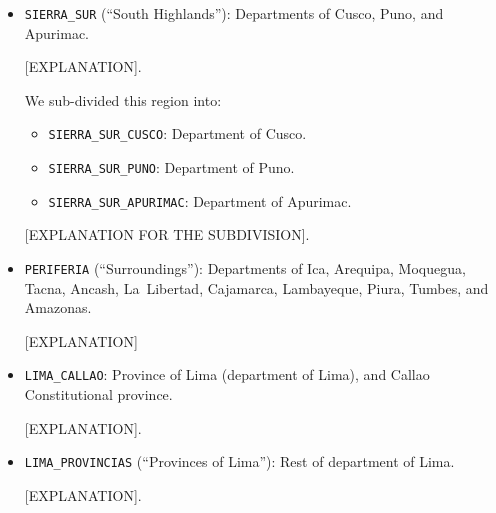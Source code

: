 \documentclass[class=article, crop=false]{standalone}
\begin{document}
\begin{itemize}
  \item  \texttt{SIERRA\_SUR} (``South Highlands''): Departments of Cusco, Puno, and Apurimac.

    [EXPLANATION].

    We sub-divided this region into:
    \begin{itemize}
      \item \texttt{SIERRA\_SUR\_CUSCO}: Department of Cusco.
      \item \texttt{SIERRA\_SUR\_PUNO}: Department of Puno.
      \item \texttt{SIERRA\_SUR\_APURIMAC}: Department of Apurimac.
    \end{itemize}

    [EXPLANATION FOR THE SUBDIVISION].

  \item \texttt{PERIFERIA} (``Surroundings''): Departments of Ica, Arequipa, Moquegua, Tacna, Ancash, La~Libertad, Cajamarca, Lambayeque, Piura, Tumbes, and Amazonas.

    [EXPLANATION]

  \item \texttt{LIMA\_CALLAO}: Province of Lima (department of Lima), and Callao Constitutional province.

    [EXPLANATION].

  \item \texttt{LIMA\_PROVINCIAS} (``Provinces of Lima''): Rest of department of Lima.

    [EXPLANATION].

\end{itemize}
\end{document}
